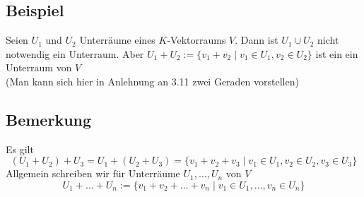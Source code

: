 \subsection{Beispiel} %
\label{sub:beispiel}
Seien $U_1$ und $U_2$ Unterräume eines $K$-Vektorraums $V$. Dann ist $U_1 \cup U_2$ nicht notwendig ein Unterraum.
Aber $U_1 + U_2 := \{v_1 + v_2 \mid v_1 \in U_1, v_2 \in U_2 \}$ ist ein ein Unterraum von $V$ \\
{\tiny (Man kann sich hier in Anlehnung an 3.11 zwei Geraden vorstellen)}
\subsection{Bemerkung} %
\label{sub:bemerkung}
Es gilt
\[
	(U_1 + U_2)+ U_3 = U_1 + (U_2 + U_3) = \{v_1 + v_2 + v_3 \mid v_1 \in U_1, v_2 \in U_2, v_3 \in U_3\}
\]
Allgemein schreiben wir für Unterräume $U_1, \ldots , U_n$ von $V$
\[
	U_1 + \ldots + U_n := \{ v_1 + v_2 + \ldots  + v_n \mid v_1 \in U_1, \ldots , v_n  \in U_n\}
\]

